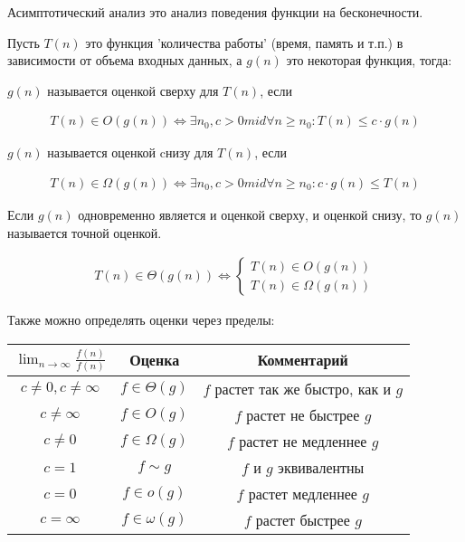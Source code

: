 
Асимптотический анализ это анализ поведения функции на бесконечности.

Пусть \(T(n)\) это функция 'количества работы' (время, память и т.п.) в
зависимости от объема входных данных, а \(g(n)\) это некоторая функция, тогда:

\begin{definition}
  \(g(n)\) называется оценкой сверху для \(T(n)\), если

  \begin{align*}
    T(n) \in O(g(n)) \iff
      \exists n_{0}, c > 0 mid \forall n \ge n_{0} \colon T(n) \le c \cdot g(n)
  \end{align*}
\end{definition}

\begin{definition}
  \(g(n)\) называется оценкой cнизу для \(T(n)\), если
  
  \begin{align*}
    T(n) \in \Omega(g(n)) \iff
      \exists n_{0}, c > 0 mid \forall n \ge n_{0} \colon c \cdot g(n) \le T(n)
  \end{align*}
\end{definition}

\begin{definition}
  Если \(g(n)\) одновременно является и оценкой сверху, и оценкой снизу, то
  \(g(n)\) называется точной оценкой.

  \begin{align*}
    T(n) \in \Theta(g(n)) \iff \begin{cases}
      T(n) \in O(g(n)) \\
      T(n) \in \Omega(g(n))
    \end{cases}
  \end{align*}
\end{definition}

Также можно определять оценки через пределы:

\begin{table}[H]
  \centering

  \renewcommand{\arraystretch}{1.5}
  \begin{tabular}{c|c|c}
    \(\lim_{n \to \infty} \frac{f(n)}{f(n)}\) & Оценка & Комментарий
    \\ \hline 
    \(c \neq 0, c \neq \infty\)
      & \(f \in \Theta(g)\)
      & \(f\) растет так же быстро, как и \(g\)
    \\
    \(c \neq \infty\)
      & \(f \in O(g)\)
      & \(f\) растет не быстрее \(g\)
    \\
      \(c \neq 0\)
        & \(f \in \Omega(g)\)
        & \(f\) растет не медленнее \(g\)
    \\
      \(c = 1\)
        & \(f \sim g\)
        & \(f\) и \(g\) эквивалентны
    \\
      \(c = 0\)
        & \(f \in o(g)\)
        & \(f\) растет медленнее \(g\)
    \\
      \(c = \infty\)
        & \(f \in \omega(g)\)
        & \(f\) растет быстрее \(g\)
  \end{tabular}
\end{table}

